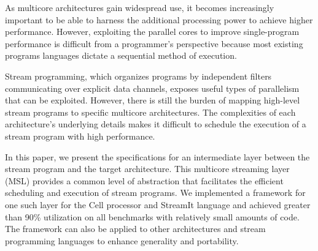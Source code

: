 %
%
%
%
%
% 
% 
%

As multicore architectures gain widespread use, it becomes increasingly important to be able to harness the
additional processing power to achieve higher performance. However, exploiting the parallel cores to
improve single-program performance is difficult from a
programmer's perspective because most existing programs languages dictate a sequential method of execution.

Stream programming, which organizes programs by independent filters communicating over explicit data channels, 
exposes useful types of parallelism that can be exploited. However, there is still the burden of mapping high-level stream programs to
specific multicore architectures. The complexities of each architecture's underlying details makes it difficult to
schedule the execution of a stream program with high performance.

In this paper, we present the specifications for an intermediate layer between the stream program and the target architecture.
This multicore streaming layer (MSL) provides a common level of abstraction that facilitates the efficient scheduling and
execution of stream programs. We implemented a framework for one such layer for the Cell processor and StreamIt language
and achieved greater than
90\% utilization on all benchmarks with relatively small amounts of code. The framework can also be applied to other
architectures and stream programming languages to enhance generality and portability.




